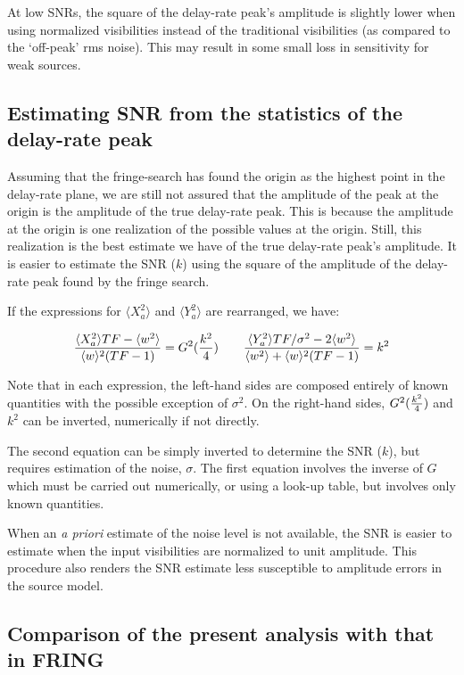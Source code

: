 At low SNRs, the square of the delay-rate peak's amplitude is slightly
lower when using normalized visibilities instead of the traditional
visibilities (as compared to the `off-peak' rms noise).  This may
result in some small loss in sensitivity for weak sources.

\subsection{Estimating SNR from the statistics of the delay-rate peak}

Assuming that the fringe-search has found the origin as the highest
point in the delay-rate plane, we are still not assured that the
amplitude of the peak at the origin is the amplitude of the true
delay-rate peak.  This is because the amplitude at the origin is one
realization of the possible values at the origin.  Still, this
realization is the best estimate we have of the true delay-rate peak's
amplitude.  It is easier to estimate the SNR ($k$) using the square of the
amplitude of the delay-rate peak found by the fringe search.

If the expressions for $\langle X_a^2\rangle$ and $\langle
Y_a^2\rangle$ are rearranged, we have:

$$ {\langle X_a^2\rangle  TF - \langle w^2\rangle \over \langle w\rangle ^2 (TF-1)} = G^2({k^2\over4}) \qquad
 {\langle Y_a^2\rangle TF/\sigma^2 - 2\langle w^2\rangle \over\langle w^2\rangle  + \langle w\rangle ^2(TF-1)} = k^2$$

Note that in each expression, the left-hand sides are composed
entirely of known quantities with the possible exception of
$\sigma^2$.  On the right-hand sides, $G^2({k^2\over4})$ and $k^2$ can
be inverted, numerically if not directly.

The second equation can be simply inverted to determine the SNR ($k$),
but requires estimation of the noise, $\sigma$.  The first equation
involves the inverse of $G$ which must be carried out numerically, or
using a look-up table, but involves only known quantities.

When an {\it a priori} estimate of the noise level is not available,
the SNR is easier to estimate when the input visibilities are
normalized to unit amplitude.  This procedure also renders the SNR
estimate less susceptible to amplitude errors in the source model.

\subsection{Comparison of the present analysis with that in FRING}

